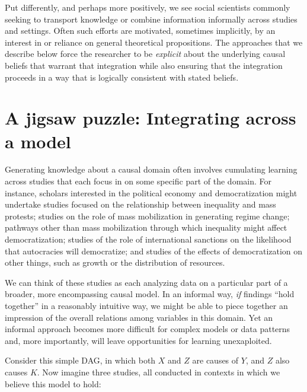 \documentclass[
  12pt,
]{book}
\begin{document}
Put differently, and perhaps more positively, we see social scientists commonly seeking to transport knowledge or combine information informally across studies and settings. Often such efforts are motivated, sometimes implicitly, by an interest in or reliance on general theoretical propositions. The approaches that we describe below force the researcher to be \emph{explicit} about the underlying causal beliefs that warrant that integration while also ensuring that the integration proceeds in a way that is logically consistent with stated beliefs.

\hypertarget{a-jigsaw-puzzle-integrating-across-a-model}{%
\section{A jigsaw puzzle: Integrating across a model}\label{a-jigsaw-puzzle-integrating-across-a-model}}

Generating knowledge about a causal domain often involves cumulating learning across studies that each focus in on some specific part of the domain. For instance, scholars interested in the political economy and democratization might undertake studies focused on the relationship between inequality and mass protests; studies on the role of mass mobilization in generating regime change; pathways other than mass mobilization through which inequality might affect democratization; studies of the role of international sanctions on the likelihood that autocracies will democratize; and studies of the effects of democratization on other things, such as growth or the distribution of resources.

We can think of these studies as each analyzing data on a particular part of a broader, more encompassing causal model. In an informal way, \emph{if} findings ``hold together'' in a reasonably intuitive way, we might be able to piece together an impression of the overall relations among variables in this domain. Yet an informal approach becomes more difficult for complex models or data patterns and, more importantly, will leave opportunities for learning unexaploited.

Consider this simple DAG, in which both \(X\) and \(Z\) are causes of \(Y\), and \(Z\) also causes \(K\). Now imagine three studies, all conducted in contexts in which we believe this model to hold:
\end{document}
